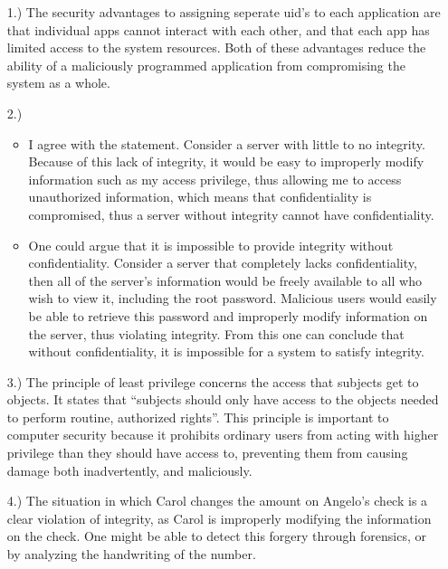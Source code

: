 \documentclass[11pt]{article}
\begin{document}
\pagestyle{fancy}
\fancyhead{}

\normalsize

\begin{itemize}
    \item [1.)] The security advantages to assigning seperate uid's to each application are that individual apps cannot interact with each other, and that each app has limited access to the system resources. Both of these advantages reduce the ability of a maliciously programmed application from compromising the system as a whole.

    \item [2.)] \begin{itemize}
        \item I agree with the statement. Consider a server with little to no integrity. Because of this lack of integrity, it would be easy to improperly modify information such as my access privilege, thus allowing me to access unauthorized information, which means that confidentiality is compromised, thus a server without integrity cannot have confidentiality.

        \item One could argue that it is impossible to provide integrity without confidentiality. Consider a server that completely lacks confidentiality, then all of the server's information would be freely available to all who wish to view it, including the root password. Malicious users would easily be able to retrieve this password and improperly modify information on the server, thus violating integrity. From this one can conclude that without confidentiality, it is impossible for a system to satisfy integrity.
    \end{itemize}

    \item [3.)] The principle of least privilege concerns the access that subjects get to objects. It states that ``subjects should only have access to the objects needed to perform routine, authorized rights''. This principle is important to computer security because it prohibits ordinary users from acting with higher privilege than they should have access to, preventing them from causing damage both inadvertently, and maliciously.

    \item [4.)] The situation in which Carol changes the amount on Angelo's check is a clear violation of integrity, as Carol is improperly modifying the information on the check. One might be able to detect this forgery through forensics, or by analyzing the handwriting of the number.


\end{itemize}
\end{document}
